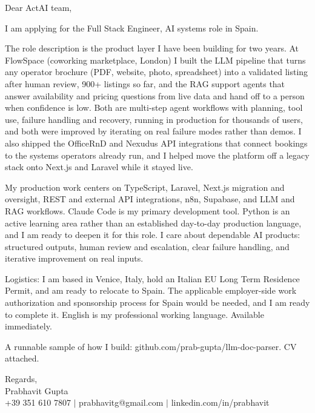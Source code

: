 \documentclass[a4paper,11pt]{article}
\begin{document}
Dear ActAI team,

I am applying for the Full Stack Engineer, AI systems role in Spain.

The role description is the product layer I have been building for two years. At FlowSpace (coworking marketplace, London) I built the LLM pipeline that turns any operator brochure (PDF, website, photo, spreadsheet) into a validated listing after human review, 900+ listings so far, and the RAG support agents that answer availability and pricing questions from live data and hand off to a person when confidence is low. Both are multi-step agent workflows with planning, tool use, failure handling and recovery, running in production for thousands of users, and both were improved by iterating on real failure modes rather than demos. I also shipped the OfficeRnD and Nexudus API integrations that connect bookings to the systems operators already run, and I helped move the platform off a legacy stack onto Next.js and Laravel while it stayed live.

My production work centers on TypeScript, Laravel, Next.js migration and oversight, REST and external API integrations, n8n, Supabase, and LLM and RAG workflows. Claude Code is my primary development tool. Python is an active learning area rather than an established day-to-day production language, and I am ready to deepen it for this role. I care about dependable AI products: structured outputs, human review and escalation, clear failure handling, and iterative improvement on real inputs.

Logistics: I am based in Venice, Italy, hold an Italian EU Long Term Residence Permit, and am ready to relocate to Spain. The applicable employer-side work authorization and sponsorship process for Spain would be needed, and I am ready to complete it. English is my professional working language. Available immediately.

A runnable sample of how I build: github.com/prab-gupta/llm-doc-parser. CV attached.

Regards,\\
Prabhavit Gupta\\
+39 351 610 7807 $\vert$ prabhavitg@gmail.com $\vert$ linkedin.com/in/prabhavit
\end{document}
